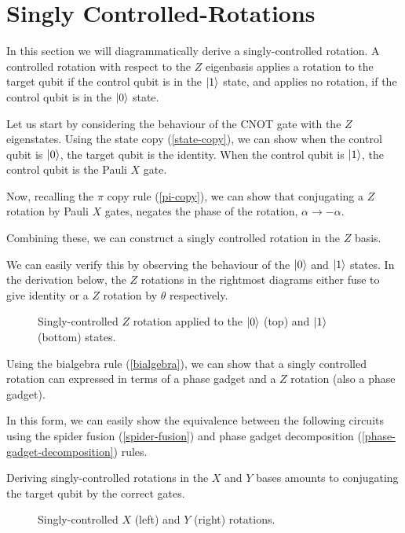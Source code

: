 \section{Singly Controlled-Rotations}

In this section we will diagrammatically derive a singly-controlled rotation. A controlled rotation with respect to the $Z$ eigenbasis applies a rotation to the target qubit if the control qubit is in the $\ket 1$ state, and applies no rotation, if the control qubit is in the $\ket 0$ state.

Let us start by considering the behaviour of the CNOT gate with the $Z$ eigenstates. Using the state copy (\ref{state-copy}), we can show when the control qubit is $\ket 0$, the target qubit is the identity. When the control qubit is $\ket 1$, the control qubit is the Pauli $X$ gate.


Now, recalling the $\pi$ copy rule (\ref{pi-copy}), we can show that conjugating a $Z$ rotation by Pauli $X$ gates, negates the phase of the rotation, $\alpha \rightarrow -\alpha$.


Combining these, we can construct a singly controlled rotation in the $Z$ basis.


We can easily verify this by observing the behaviour of the $\ket 0$ and $\ket 1$ states. In the derivation below, the $Z$ rotations in the rightmost diagrams either fuse to give identity or a $Z$ rotation by $\theta$ respectively.

\begin{figure}[H]
    \centering
    \vspace{0.5cm}
    \caption{Singly-controlled $Z$ rotation applied to the $\ket 0$ (top) and $\ket 1$ (bottom) states.}
\end{figure}

Using the bialgebra rule (\ref{bialgebra}), we can show that a singly controlled rotation can expressed in terms of a phase gadget and a $Z$ rotation (also a phase gadget).


In this form, we can easily show the equivalence between the following circuits using the spider fusion (\ref{spider-fusion}) and phase gadget decomposition (\ref{phase-gadget-decomposition}) rules.


Deriving singly-controlled rotations in the $X$ and $Y$ bases amounts to conjugating the target qubit by the correct gates.

\begin{figure}[H]
    \centering
    \caption{Singly-controlled $X$ (left) and $Y$ (right) rotations.}
\end{figure}

